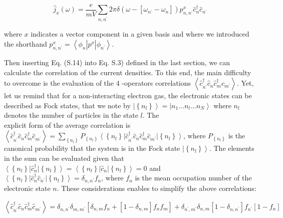 \documentclass[10pt]{article}
\begin{document}
\begin{equation*}
\hat{j}_{x}(\omega)=\frac{e}{m V} \sum_{n, n^{\prime}} 2 \pi \delta\left(\omega-\left[\omega_{n^{\prime}}-\omega_{n}\right]\right) p_{n, n^{\prime}}^{x} \hat{c}_{n}^{\dagger} \hat{c}_{n^{\prime}} \tag{S.14}
\end{equation*}


where $x$ indicates a vector component in a given basis and where we introduced the shorthand $p_{n, n^{\prime}}^{x}=\left\langle\phi_{n}\right| p^{x}\left|\phi_{n^{\prime}}\right\rangle$.

Then inserting Eq. (S.14) into Eq. S.3) defined in the last section, we can calculate the correlation of the current densities. To this end, the main difficulty to overcome is the evaluation of the 4 -operators correlations $\left\langle\hat{c}_{n^{\prime}}^{\dagger} \hat{c}_{n} \hat{c}_{m}^{\dagger} \hat{c}_{m^{\prime}}\right\rangle$. Yet, let us remind that for a non-interacting electron gas, the electronic states can be described as Fock states, that we note by $\left|\left\{n_{l}\right\}\right\rangle=\left|n_{1} \ldots n_{l} \ldots n_{N}\right\rangle$ where $n_{l}$ denotes the number of particles in the state $l$. The\\
explicit form of the average correlation is $\left\langle\hat{c}_{n^{\prime}}^{\dagger} \hat{c}_{n} \hat{c}_{m}^{\dagger} \hat{c}_{m^{\prime}}\right\rangle=\sum_{\left\{n_{l}\right\}} P_{\left\{n_{l}\right\}}\left\langle\left\{n_{l}\right\}\right| \hat{c}_{n^{\prime}}^{\dagger} \hat{c}_{n} \hat{c}_{m}^{\dagger} \hat{c}_{m^{\prime}}\left|\left\{n_{l}\right\}\right\rangle$, where $P_{\left\{n_{l}\right\}}$ is the canonical probability that the system is in the Fock state $\left|\left\{n_{l}\right\}\right\rangle$. The elements in the sum can be evaluated given that $\left\langle\left\{n_{l}\right\}\right| \hat{c}_{n}^{\dagger}\left|\left\{n_{l}\right\}\right\rangle=\left\langle\left\{n_{l}\right\}\right| \hat{c}_{n}\left|\left\{n_{l}\right\}\right\rangle=0$ and $\left\langle\left\{n_{l}\right\}\right| \hat{c}_{n}^{\dagger} \hat{c}_{n^{\prime}}\left|\left\{n_{l}\right\}\right\rangle=\delta_{n, n^{\prime}} f_{n}$, where $f_{n}$ is the mean occupation number of the electronic state $n$. These considerations enables to simplify the above correlations:


\begin{equation*}
\left\langle\hat{c}_{n^{\prime}}^{\dagger} \hat{c}_{n} \hat{c}_{m}^{\dagger} \hat{c}_{m^{\prime}}\right\rangle=\delta_{n, n^{\prime}} \delta_{m, m^{\prime}}\left[\delta_{n, m} f_{n}+\left[1-\delta_{n, m}\right] f_{n} f_{m}\right]+\delta_{n^{\prime}, m^{\prime}} \delta_{n, m}\left[1-\delta_{n, n^{\prime}}\right] f_{n^{\prime}}\left[1-f_{n}\right] \tag{S.15}
\end{equation*}
\end{document}
